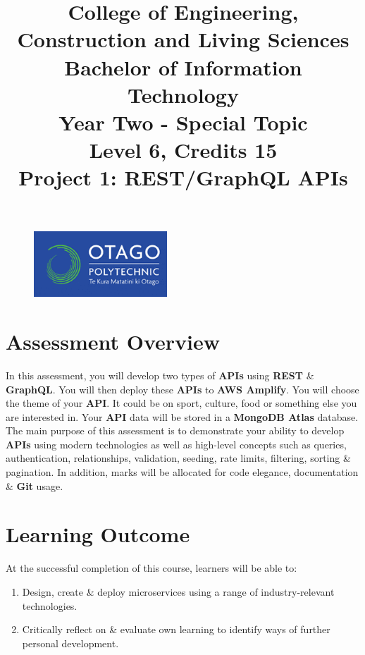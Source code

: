 \documentclass{article}
\author{}
\begin{document}
\begin{figure}
    \centering
    \includegraphics[width=50mm]{../img/logo.png}
\end{figure}

\title{College of Engineering, Construction and Living Sciences\\Bachelor of Information Technology\\Year Two - Special Topic\\Level 6, Credits 15\\\textbf{Project 1: REST/GraphQL APIs}}
\date{}
\maketitle

\section*{Assessment Overview}
In this assessment, you will develop two types of \textbf{APIs} using \textbf{REST} \& \textbf{GraphQL}. You will then deploy these \textbf{APIs} to \textbf{AWS Amplify}. You will choose the theme of your \textbf{API}. It could be on sport, culture, food or something else you are interested in. Your \textbf{API} data will be stored in a \textbf{MongoDB Atlas} database. The main purpose of this assessment is to demonstrate your ability to develop \textbf{APIs} using modern technologies as well as high-level concepts such as queries, authentication, relationships, validation, seeding, rate limits, filtering, sorting \& pagination. In addition, marks will be allocated for code elegance, documentation \& \textbf{Git} usage. 

\section*{Learning Outcome}
At the successful completion of this course, learners will be able to:
\begin{enumerate}
    \item Design, create \& deploy microservices using a range of industry-relevant technologies. 
    \item Critically reflect on \& evaluate own learning to identify ways of further personal development.  
\end{enumerate}
\end{document}
